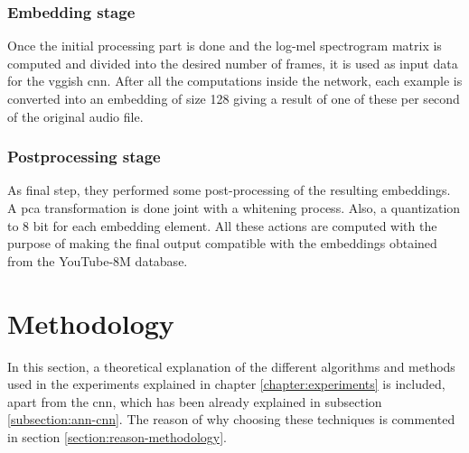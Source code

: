 \subsubsection*{Embedding stage}

	Once the initial processing part is done and the log-mel spectrogram matrix is computed and divided into the desired number of frames, it is used as input data for the \acrshort{vgg}ish \acrshort{cnn}. After all the computations inside the network, each example is converted into an embedding of size 128 giving a result of one of these per second of the original audio file.

\subsubsection*{Postprocessing stage}

	As final step, they performed some post-processing of the resulting embeddings. A \acrfull{pca} \cite{Abdi2010} transformation is done joint with a whitening process. Also, a quantization to 8 bit for each embedding element. All these actions are computed with the purpose of making the final output compatible with the embeddings obtained from the YouTube-8M database.
	
\section{Methodology}
\label{section:methodology}

	In this section, a theoretical explanation of the different algorithms and methods used in the experiments explained in chapter \ref{chapter:experiments} is included, apart from the \acrshort{cnn}, which has been already explained in subsection \ref{subsection:ann-cnn}. The reason of why choosing these techniques is commented in section \ref{section:reason-methodology}.
	
	
	
	
	
	
	

